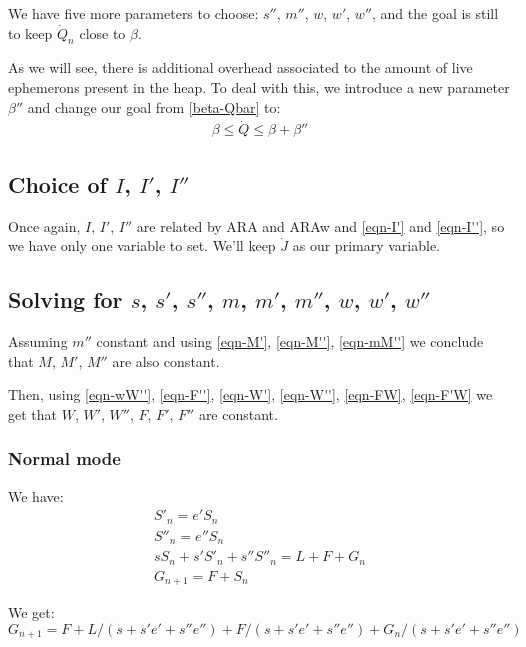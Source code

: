 \documentclass{article}
\begin{document}
We have five more parameters to choose: $s''$, $m''$, $w$, $w'$,
$w''$, and the goal
is still to keep $\dot{Q}_n$ close to $\beta$.

As we will see, there is additional overhead associated to the amount
of live ephemerons present in the heap. To deal with this, we
introduce a new parameter $\beta''$ and change our goal from
\eqref{beta-Qbar} to:
\begin{gather}
\beta \leq \dot{Q} \leq \beta + \beta'' \label{beta''-Qbar}
\end{gather}


\subsection[Choice of I, I', I'']{Choice of $I$, $I'$, $I''$}

Once again, $I$, $I'$, $I''$ are related by ARA and ARAw and
\eqref{eqn-I'} and \eqref{eqn-I''}, so we have only one variable to
set. We'll keep $\dot{J}$ as our primary variable.


\subsection[Solving for s, s', s'', m, m', m'', w, w', w'']
{Solving for $s$, $s'$, $s''$, $m$, $m'$, $m''$, $w$, $w'$, $w''$}

Assuming $m''$ constant
and using \eqref{eqn-M'}, \eqref{eqn-M''},
\eqref{eqn-mM''} we conclude that $M$, $M'$, $M''$
are also constant.

Then, using \eqref{eqn-wW''}, \eqref{eqn-F''}, \eqref{eqn-W'},
\eqref{eqn-W''}, \eqref{eqn-FW}, \eqref{eqn-F'W} we get that $W$,
$W'$, $W''$, $F$, $F'$, $F''$ are constant.


\subsubsection{Normal mode}

We have:
\begin{gather*}
S'_n = e'S_n \\
S''_n = e''S_n \\
sS_n + s'S'_n + s''S''_n = L + F + G_n \\
G_{n+1} = F + S_n
\end{gather*}

We get:
\begin{equation}
G_{n+1} = F + L/(s+s'e'+s''e'') + F/(s+s'e'+s''e'') + G_n/(s+s'e'+s''e'')
\end{equation}
\end{document}
